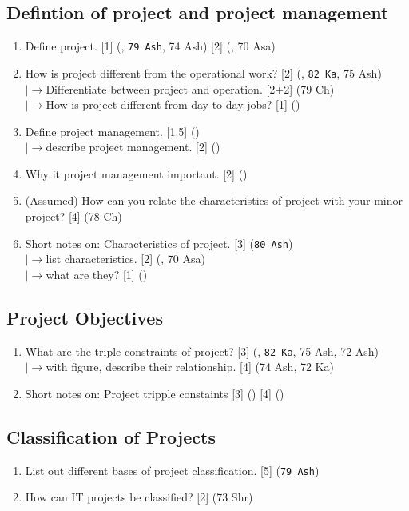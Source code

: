 \documentclass[12pt]{article}
\newcommand{\lb}{\\$\left|\rightarrow\right.$}
\begin{document}
  \subsection{Defintion of project and project management}
    \begin{enumerate}
      \item Define project. \hfill [1] (, \texttt{79 Ash}, 74 Ash) [2] (, 70 Asa)

      \item How is project different from the operational work? \hfill [2] (, \texttt{82 Ka}, 75 Ash)
        \lb Differentiate between project and operation. \hfill [2+2] (79 Ch)
        \lb How is project different from day-to-day jobs? \hfill [1] ()
      
      \item Define project management. \hfill [1.5] ()
        \lb describe project management. \hfill [2] ()

      \item Why it project management important. \hfill [2] ()

      \item (Assumed) How can you relate the characteristics of project with your minor project? \hfill [4] (78 Ch)

      \item Short notes on: Characteristics of project. \hfill [3] (\texttt{80 Ash})
        \lb list characteristics. \hfill [2] (, 70 Asa)
        \lb what are they? [1] ()
    \end{enumerate}
  
  \subsection{Project Objectives}
    \begin{enumerate}
      \item What are the triple constraints of project? \hfill [3] (, \texttt{82 Ka}, 75 Ash, 72 Ash)
        \lb with figure, describe their relationship. \hfill [4] (74 Ash, 72 Ka)

      \item Short notes on: Project tripple constaints \hfill [3] () [4] ()
    \end{enumerate}

  \subsection{Classification of Projects}
    \begin{enumerate}
      \item List out different bases of project classification. \hfill [5] (\texttt{79 Ash})

      \item How can IT projects be classified? \hfill [2] (73 Shr)
    \end{enumerate}
\end{document}
